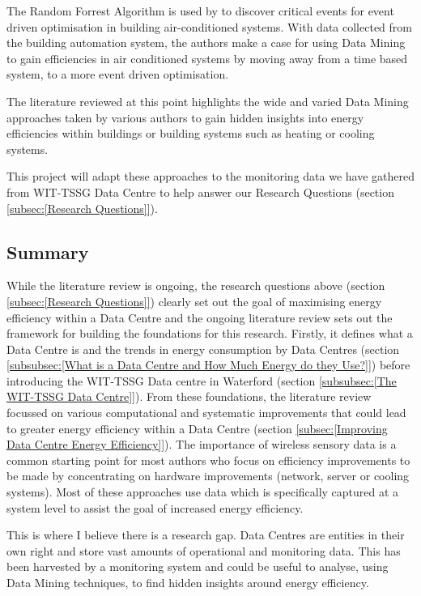 \documentclass[12pt]{scrartcl}
\begin{document}
The Random Forrest Algorithm is used by \citet{WANG2017251} to discover critical events for event driven optimisation in building air-conditioned systems. With data collected from the building automation system, the authors make a case for using Data Mining to gain efficiencies in air conditioned systems by moving away from a time based system, to a more event driven optimisation.  

The literature reviewed at this point highlights the wide and varied Data Mining approaches taken by various authors to gain hidden insights into energy efficiencies within buildings or building systems such as heating or cooling systems. 

This project will adapt these approaches to the monitoring data we have gathered from WIT-TSSG Data Centre to help answer our Research Questions (section \ref{subsec:[Research Questions]}).   

\subsection{Summary}  
\label{subsec:[Summary]}
While the literature review is ongoing, the research questions above (section \ref{subsec:[Research Questions]}) clearly set out the goal of maximising energy efficiency within a Data Centre and the ongoing literature review sets out the framework for building the foundations for this research. Firstly, it defines what a Data Centre is and the trends in energy consumption by Data Centres (section \ref{subsubsec:[What is a Data Centre and How Much Energy do they Use?]}) before introducing the WIT-TSSG Data centre in Waterford (section \ref{subsubsec:[The WIT-TSSG Data Centre]}). From these foundations, the literature review focussed on various computational and systematic improvements that could lead to greater energy efficiency within a Data Centre (section \ref{subsec:[Improving Data Centre Energy Efficiency]}). The importance of wireless sensory data is a common starting point for most authors who focus on efficiency improvements to be made by concentrating on hardware improvements (network, server or cooling systems). Most of these approaches use data which is specifically captured at a system level to assist the goal of increased energy efficiency.

This is where I believe there is a research gap. Data Centres are entities in their own right and store vast amounts of operational and monitoring data. This has been harvested by a monitoring system and could be useful to analyse, using Data Mining techniques, to find hidden insights around energy efficiency. 
\end{document}
